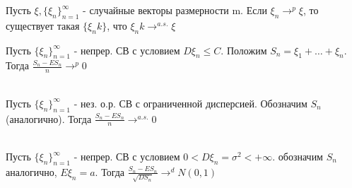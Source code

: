 	\begin{theorem}
		Пусть $\xi, \{\xi_n\}_{n=1}^{\infty}$ - случайные векторы размерности m. Если $\xi_n \to^p \xi$, то существует такая $\{\xi_nk\}$, что 
		$\xi_nk \to^{a.s.} \xi$
	\end{theorem}
	
	\begin{theorem}[<ЗБЧ>]
		Пусть $\{\xi_n\}_{n=1}^\infty$ - непрер. СВ с условием  $D\xi_n \le C$. Положим $S_n = \xi_1 + \ldots + \xi_n$.
		Тогда $\frac{S_n - ES_n}{n} \to^p 0$\\
	\end{theorem} 
	
	\begin{theorem}[<УЗБЧ>]\\
		Пусть $\{\xi_n\}_{n=1}^\infty$ - нез. о.р. СВ с ограниченной дисперсией. Обозначим $S_n$ (аналогично). 
		Тогда $\frac{S_n - ES_n}{n} \to^{a.s.} 0$\\
	\end{theorem} 
	
	\begin{theorem}\\
		Пусть $\{\xi_n\}_{n=1}^\infty$ - непрер. СВ с условием  $0 < D\xi_n =\sigma^2 < +\infty$. обозначим $S_n$ аналогично, $E\xi_n = a$.
		Тогда $\frac{S_n - ES_n}{\sqrt{DS_n}} \to^d N(0,1)$ 	\\
	\end{theorem} 
	
